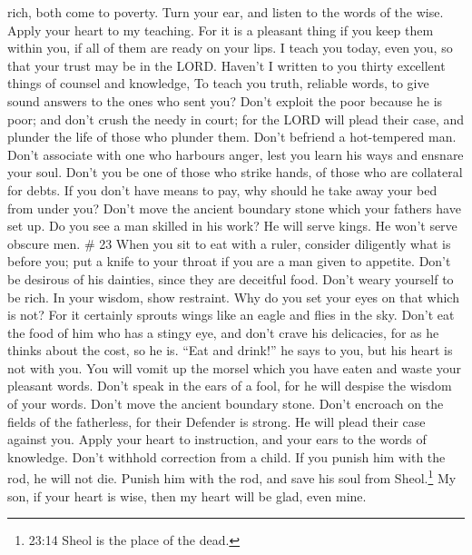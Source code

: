 rich, both come to poverty.  Turn your ear, and listen to
the words of the wise. Apply your heart to my teaching. 
For it is a pleasant thing if you keep them within you, if all of them
are ready on your lips.  I teach you today, even you, so
that your trust may be in the LORD.  Haven't I written to
you thirty excellent things of counsel and knowledge,  To
teach you truth, reliable words, to give sound answers to the ones who
sent you?  Don't exploit the poor because he is poor; and
don't crush the needy in court;  for the LORD will plead
their case, and plunder the life of those who plunder them.
 Don't befriend a hot-tempered man. Don't associate with
one who harbours anger,  lest you learn his ways and
ensnare your soul.  Don't you be one of those who strike
hands, of those who are collateral for debts.  If you don't
have means to pay, why should he take away your bed from under you?
 Don't move the ancient boundary stone which your fathers
have set up.  Do you see a man skilled in his work? He will
serve kings. He won't serve obscure men. \# 23  When you sit
to eat with a ruler, consider diligently what is before you;
 put a knife to your throat if you are a man given to
appetite.  Don't be desirous of his dainties, since they are
deceitful food.  Don't weary yourself to be rich. In your
wisdom, show restraint.  Why do you set your eyes on that
which is not? For it certainly sprouts wings like an eagle and flies in
the sky.  Don't eat the food of him who has a stingy eye,
and don't crave his delicacies,  for as he thinks about the
cost, so he is. ``Eat and drink!'' he says to you, but his heart is not
with you.  You will vomit up the morsel which you have eaten
and waste your pleasant words.  Don't speak in the ears of a
fool, for he will despise the wisdom of your words.  Don't
move the ancient boundary stone. Don't encroach on the fields of the
fatherless,  for their Defender is strong. He will plead
their case against you.  Apply your heart to instruction,
and your ears to the words of knowledge.  Don't withhold
correction from a child. If you punish him with the rod, he will not
die.  Punish him with the rod, and save his soul from
Sheol.\footnote{23:14 Sheol is the place of the dead.}  My
son, if your heart is wise, then my heart will be glad, even mine.
